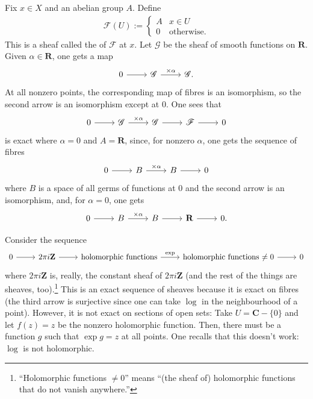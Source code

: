 \documentclass [11 pt, oneside, margin = 1 in] {article}
\begin{document}
\begin{example}\label{}\text{}
Fix $x\in X$ and an abelian group $A$. Define
\begin{align*}
	\mathscr{F}(U) := 
	 \begin{cases}
		 A & x\in U\\
		 0&\textrm{otherwise.}
	\end{cases}
\end{align*}
This is a sheaf called the  of $\mathscr{F}$ at $x$. Let $\mathscr{G}$ be the sheaf of smooth functions on $\mathbf{R}$. Given $\alpha\in \mathbf{R}$, one gets a map 
\[
\begin{tikzcd}
	0\ar[r] & \mathscr{G}\ar[r, "\times \alpha"] &\mathscr{G}.
\end{tikzcd}
\]
At all nonzero points, the corresponding map of fibres is an isomorphism, so the second arrow is an isomorphism except at $0$. One sees that
\[
\begin{tikzcd}
	0\ar[r] &\mathscr{G}\ar[r,"\times \alpha"] &\mathscr{G}\ar[r] &\mathscr{F}\ar[r] &0
\end{tikzcd}
\]
is exact where $\alpha = 0$ and $A=\mathbf{R}$, since, for nonzero $\alpha$, one gets the sequence of fibres
\[
\begin{tikzcd}
	0 \ar[r] & B\ar[r, "\times \alpha"] & B\ar[r] &0
\end{tikzcd}
\]
where $B$ is a space of all germs of functions at $0$ and the second arrow is an isomorphism, and, for $\alpha = 0$, one gets
\[
\begin{tikzcd}
	0\ar[r] & B\ar[r,"\times\alpha"] & B\ar[r] & \mathbf{R}\ar[r] & 0.
\end{tikzcd}
\]
\end{example}

\begin{example}[ ]\label{}\text{}
Consider the sequence
\[
\begin{tikzcd}
	0 \ar[r] & 2\pi i \mathbf{Z} \ar[r] & \textrm{holomorphic functions} \ar[r, "\exp"] &\textrm{holomorphic functions $\ne 0$} \ar[r] & 0
\end{tikzcd}
\]
where $2\pi i \mathbf{Z}$ is, really, the constant sheaf of $2\pi i \mathbf{Z}$ (and the rest of the things are sheaves, too).\footnote{``Holomorphic functions $\ne 0$'' means ``(the sheaf of) holomorphic functions that do not vanish anywhere.''} This is an exact sequence of sheaves because it is exact on fibres (the third arrow is surjective since one can take $\log$ in the neighbourhood of a point). However, it is not exact on sections of open sets: Take $U = \mathbf{C}-\{0\}$ and let $f(z)=z$ be the nonzero holomorphic function. Then, there must be a function $g$ such that $\exp g = z$ at all points. One recalls that this doesn't work: $\log$ is not holomorphic.
\end{example}
\end{document}
